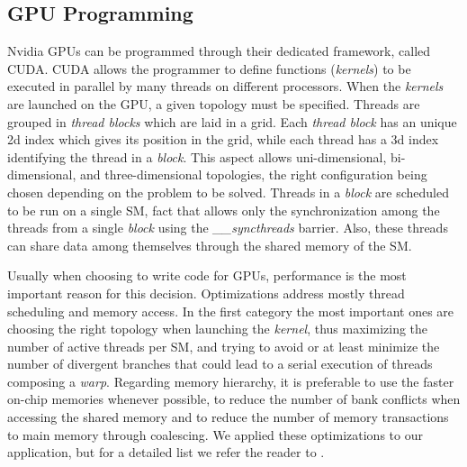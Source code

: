 \subsection{GPU Programming}

Nvidia GPUs can be programmed through their dedicated framework, called CUDA.
CUDA allows the programmer to define functions (\textit{kernels}) to be executed
in parallel by many threads on different processors. When the \textit{kernels}
are launched on the GPU, a given topology must be specified. Threads are
grouped in \textit{thread blocks} which are laid in a grid. Each \textit{thread
block} has an unique 2d index which gives its position in the grid, while each
thread has a 3d index identifying the thread in a \textit{block}. This aspect
allows uni-dimensional, bi-dimensional, and three-dimensional topologies, the
right configuration being chosen depending on the problem to be solved. Threads
in a \textit{block} are scheduled to be run on a single SM, fact that allows
only the synchronization among the threads from a single \textit{block} using
the \emph{\_\_syncthreads} barrier. Also, these threads can share data among
themselves through the shared memory of the SM.

Usually when choosing to write code for GPUs, performance is the most important
reason for this decision. Optimizations address mostly thread scheduling and
memory access. In the first category the most important ones are choosing the
right topology when launching the \textit{kernel}, thus maximizing the number of
active threads per SM, and trying to avoid or at least minimize the number of
divergent branches that could lead to a serial execution of threads composing a
\textit{warp}. Regarding memory hierarchy, it is preferable to use the faster 
on-chip memories whenever possible, to reduce the number of bank conflicts when
accessing the shared memory and to reduce the number of memory transactions to
main memory through coalescing. We applied these optimizations to our
application, but for a detailed list we refer the reader to \cite{cuda}.



